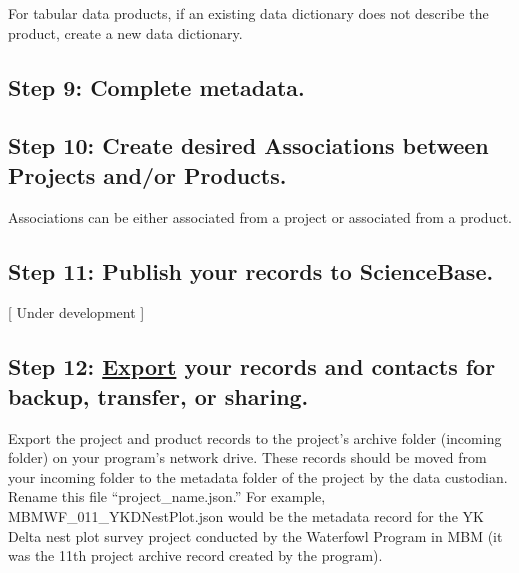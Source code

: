 \documentclass[
]{book}
\begin{document}
For tabular data products, if an existing data dictionary does not describe the product, create a new data dictionary.

\hypertarget{step-9-complete-metadata.}{%
\subsection*{Step 9: Complete metadata.}\label{step-9-complete-metadata.}}

\hypertarget{step-10-create-desired-associations-between-projects-andor-products.}{%
\subsection*{Step 10: Create desired Associations between Projects and/or Products.}\label{step-10-create-desired-associations-between-projects-andor-products.}}

Associations can be either associated from a project or associated from a product.

\hypertarget{step-11-publish-your-records-to-sciencebase.}{%
\subsection*{Step 11: Publish your records to ScienceBase.}\label{step-11-publish-your-records-to-sciencebase.}}

{[} Under development {]}

\hypertarget{step-12-export-your-records-and-contacts-for-backup-transfer-or-sharing.}{%
\subsection*{\texorpdfstring{Step 12: \protect\hyperlink{export}{Export} your records and contacts for backup, transfer, or sharing.}{Step 12: Export your records and contacts for backup, transfer, or sharing.}}\label{step-12-export-your-records-and-contacts-for-backup-transfer-or-sharing.}}

Export the project and product records to the project's archive folder (incoming folder) on your program's network drive. These records should be moved from your incoming folder to the metadata folder of the project by the data custodian. Rename this file ``project\_name.json.'' For example, MBMWF\_011\_YKDNestPlot.json would be the metadata record for the YK Delta nest plot survey project conducted by the Waterfowl Program in MBM (it was the 11th project archive record created by the program).
\end{document}
